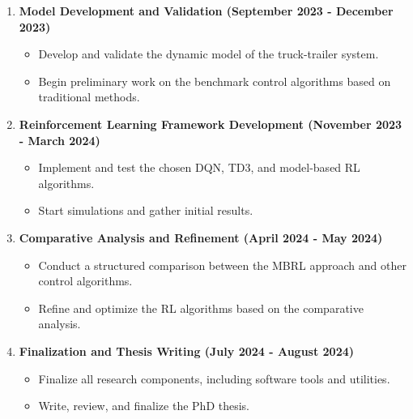 \begin{enumerate}
\item \textbf{Model Development and Validation (September 2023 - December 2023)}
\begin{itemize}
    \item Develop and validate the dynamic model of the truck-trailer system.
    \item Begin preliminary work on the benchmark control algorithms based on traditional methods.
\end{itemize}

\item \textbf{Reinforcement Learning Framework Development (November 2023 - March 2024)}
\begin{itemize}
    \item Implement and test the chosen DQN, TD3, and model-based RL algorithms.
    \item Start simulations and gather initial results.
\end{itemize}

\item \textbf{Comparative Analysis and Refinement (April 2024 - May 2024)}
\begin{itemize}
    \item Conduct a structured comparison between the MBRL approach and other control algorithms.
    \item Refine and optimize the RL algorithms based on the comparative analysis.
\end{itemize}

\item \textbf{Finalization and Thesis Writing (July 2024 - August 2024)}
\begin{itemize}
    \item Finalize all research components, including software tools and utilities.
    \item Write, review, and finalize the PhD thesis.
\end{itemize}
\end{enumerate}
